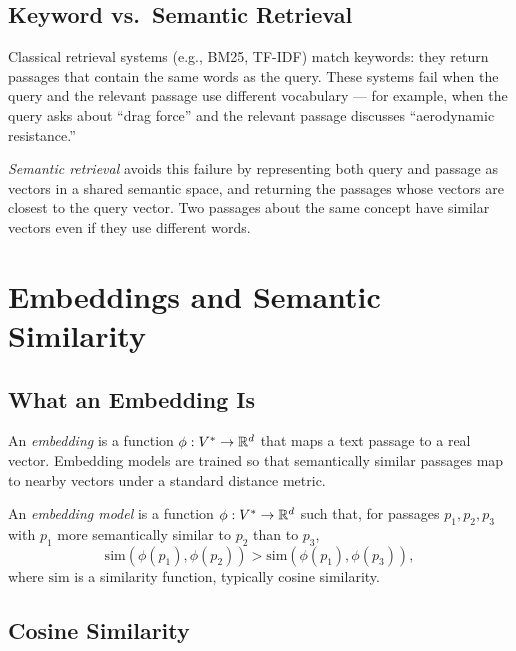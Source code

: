 \subsection{Keyword vs.\ Semantic Retrieval}

Classical retrieval systems (e.g., BM25, TF-IDF) match keywords: they return passages that contain the same words as the query.
These systems fail when the query and the relevant passage use different vocabulary — for example, when the query asks about ``drag force'' and the relevant passage discusses ``aerodynamic resistance.''

\emph{Semantic retrieval} avoids this failure by representing both query and passage as vectors in a shared semantic space, and returning the passages whose vectors are closest to the query vector.
Two passages about the same concept have similar vectors even if they use different words.

\section{Embeddings and Semantic Similarity}
\label{section:Embeddings}

\subsection{What an Embedding Is}

An \emph{embedding} is a function $\phi: V^* \to \mathbb{R}^d$ that maps a text passage to a real vector.
Embedding models are trained so that semantically similar passages map to nearby vectors under a standard distance metric.

\begin{definition}
\label{definition:Embedding}
An \emph{embedding model} is a function $\phi: V^* \to \mathbb{R}^d$ such that, for passages $p_1, p_2, p_3$ with $p_1$ more semantically similar to $p_2$ than to $p_3$,
\begin{equation}
\mathrm{sim}(\phi(p_1), \phi(p_2)) > \mathrm{sim}(\phi(p_1), \phi(p_3)) ,
\end{equation}
where $\mathrm{sim}$ is a similarity function, typically cosine similarity.
\end{definition}

\subsection{Cosine Similarity}

